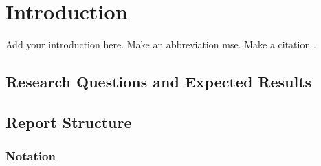 \chapter{Introduction}
\label{chap:introduction}

Add your introduction here. Make an abbreviation \acrfull{mse}. Make a citation \cite{https://doi.org/10.48550/arxiv.2303.00750}.

\section{Research Questions and Expected Results}
\label{sec:research-questions-and-expected-results}
\clearpage

\section{Report Structure}
\label{sec:report-structure}
 
 
\subsection{Notation}
\label{subsec:notation}
